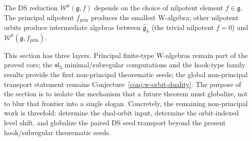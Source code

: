 The DS reduction $\mathcal{W}^k(\mathfrak{g}, f)$ depends on the choice
of nilpotent element $f \in \mathfrak{g}$.  The principal nilpotent
$f_{\mathrm{prin}}$ produces the smallest W-algebra; other nilpotent
orbits produce intermediate algebras between $\widehat{\mathfrak{g}}_k$
(the trivial nilpotent $f = 0$) and
$\mathcal{W}^k(\mathfrak{g}, f_{\mathrm{prin}})$.

\begin{remark}
This section has three layers.  Principal finite-type W-algebras remain
part of the proved core; the $\mathfrak{sl}_3$ minimal/subregular
computations and the hook-type family results provide the first
non-principal theorematic seeds; the global non-principal transport
statement remains Conjecture~\ref{conj:w-orbit-duality}.  The purpose of
the section is to isolate the mechanism that a future theorem must
globalize, not to blur that frontier into a single slogan.  Concretely,
the remaining non-principal work is threefold: determine the dual-orbit
input, determine the orbit-indexed level shift, and globalize the
paired DS seed transport beyond the present hook/subregular theorematic
seeds.
\end{remark}

